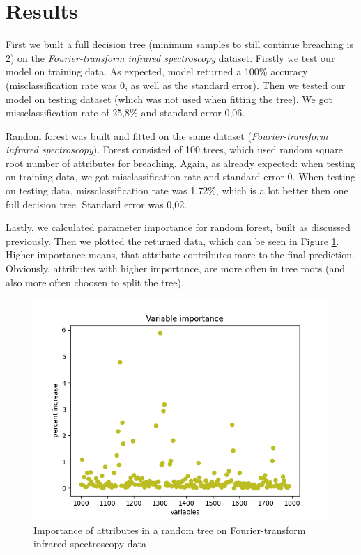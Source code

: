 \documentclass{article}
\begin{document}
\section{Results}

First we built a full decision tree (minimum samples to still continue breaching is 2) on the \emph{Fourier-transform infrared spectroscopy} dataset. Firstly we test our model on training data. As expected, model returned a 100\% accuracy (misclassification rate was 0, as well as the standard error). Then we tested our model on testing dataset (which was not used when fitting the tree). We got missclassification rate of 25,8\% and standard error 0,06.

Random forest was built and fitted on the same dataset (\emph{Fourier-transform infrared spectroscopy}). Forest consisted of 100 trees, which used random square root number of attributes for breaching. Again, as already expected: when testing on training data, we got misclassification rate and standard error 0. When testing on testing data, missclassification rate was 1,72\%, which is a lot better then one full decision tree. Standard error was 0,02.

Lastly, we calculated parameter importance for random forest, built as discussed previously. Then we plotted the returned data, which can be seen in Figure \ref{fig:example}. Higher importance means, that attribute contributes more to the final prediction. Obviously, attributes with higher importance, are more often in tree roots (and also more often choosen to split the tree). 

\begin{figure}[ht]
  \centering
  \includegraphics[width=1\textwidth]{importance.png}
  \caption{Importance of attributes in a random tree on Fourier-transform infrared spectroscopy data}
  \label{fig:example}
\end{figure}


\printbibliography
\end{document}
